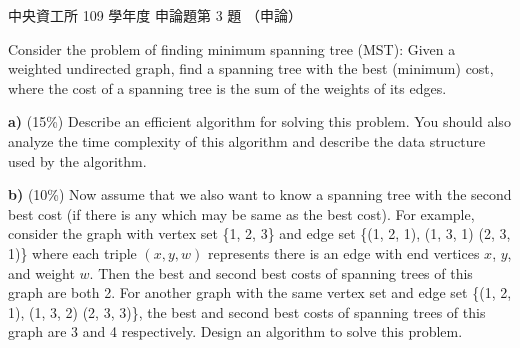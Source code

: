\begin{pastexam}[label={px:ncu-109-dsa-14}]{中央資工所 109 學年度 申論題第 3 題}
（申論）

Consider the problem of finding minimum spanning tree (MST): Given a weighted undirected graph, find
a spanning tree with the best (minimum) cost, where the cost of a spanning tree is the sum of the
weights of its edges.

\textbf{a)} (15\%) Describe an efficient algorithm for solving this problem. You should also analyze
the time complexity of this algorithm and describe the data structure used by the algorithm.

\textbf{b)} (10\%) Now assume that we also want to know a spanning tree with the second best cost
(if there is any which may be same as the best cost). For example, consider the graph with vertex
set \{1, 2, 3\} and edge set \{(1, 2, 1), (1, 3, 1) (2, 3, 1)\} where each triple $(x, y, w)$
represents there is an edge with end vertices $x$, $y$, and weight $w$. Then the best and second
best costs of spanning trees of this graph are both 2. For another graph with the same vertex set
and edge set \{(1, 2, 1), (1, 3, 2) (2, 3, 3)\}, the best and second best costs of spanning trees
of this graph are 3 and 4 respectively. Design an algorithm to solve this problem.
\end{pastexam}

